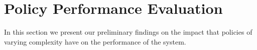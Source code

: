

	

	

\section{Policy Performance Evaluation}


In this section we present our preliminary findings on the impact that
policies of varying complexity have on the performance of the
system. %

